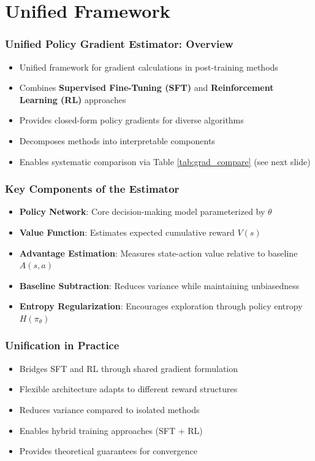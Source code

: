 \section{Unified Framework}%
\begin{frame}
\frametitle{Unified Policy Gradient Estimator: Overview}
\begin{itemize}
  \item Unified framework for gradient calculations in post-training methods
  \item Combines \textbf{Supervised Fine-Tuning (SFT)} and \textbf{Reinforcement Learning (RL)} approaches
  \item Provides closed-form policy gradients for diverse algorithms
  \item Decomposes methods into interpretable components
  \item Enables systematic comparison via Table \ref{tab:grad_compare} (see next slide)
\end{itemize}
\end{frame}%
\begin{frame}
\frametitle{Key Components of the Estimator}
\begin{itemize}
  \item \textbf{Policy Network}: Core decision-making model parameterized by $\theta$
  \item \textbf{Value Function}: Estimates expected cumulative reward $V(s)$
  \item \textbf{Advantage Estimation}: Measures state-action value relative to baseline $A(s,a)$
  \item \textbf{Baseline Subtraction}: Reduces variance while maintaining unbiasedness
  \item \textbf{Entropy Regularization}: Encourages exploration through policy entropy $H(\pi_\theta)$
\end{itemize}
\end{frame}%
\begin{frame}
\frametitle{Unification in Practice}
\begin{itemize}
  \item Bridges SFT and RL through shared gradient formulation
  \item Flexible architecture adapts to different reward structures
  \item Reduces variance compared to isolated methods
  \item Enables hybrid training approaches (SFT + RL)
  \item Provides theoretical guarantees for convergence
\end{itemize}
\end{frame}%
